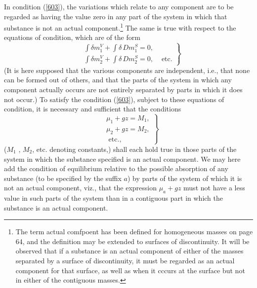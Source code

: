 \documentclass[12pt]{article}
\newcommand{\dd}{\delta}
\begin{document}
In condition (\ref{603}), the variations which relate to any component are to be regarded as having the value zero in any part of the system in which that substance is not an actual component.\footnote{The term actual comfpoent has been defined for homogeneous masses on page 64, and the definition may be extended to surfaces of discontinuity. It will be observed that if a substance is an actual component of either of the masses separated by a surface of discontinuity, it must be regarded as an actual component for that surface, as well as when it cccurs at the surface but not in either of the contiguous masses.} The same is true with respect to the equations of condition, which are of the form
\begin{equation} \left. \begin{aligned}
&\int \dd m_1^V +\int \dd \, Dm_1^S = 0, \\
&\int \dd m_2^V +\int \dd \, Dm_2^S = 0,  
&\text{ etc.}            \end{aligned} \right\}    \label{616} \end{equation}
(It is here supposed that the various components are independent, i.e., that none can be formed out of others, and that the parts of the system in which any component actually occurs are not entirely separated by parts in which it does not occur.)  To satisfy the condition (\ref{603}), subject to these equations of condition, it is necessary and sufficient that the conditions
\begin{equation} \left. \begin{aligned}
&\mu_1 + gz = M_1, \\
&\mu_2 + gz = M_2, \\ 
&\text{ etc.},\end{aligned} \right\}    \label{617} \end{equation}
($M_1$ , $M_2$, etc. denoting constants,) shall each hold true in those parts of the system in which the substance specified is an actual component. We may here add the condition of equilibrium relative to the possible absorption of any substance (to be specified by the suffix $a$) by parts of the system of which it is not an actual component, viz., that the expression $\mu_a + gz$ must not have a less value in such parts of the system than in a contiguous part in which the substance is an actual component.
\end{document}

